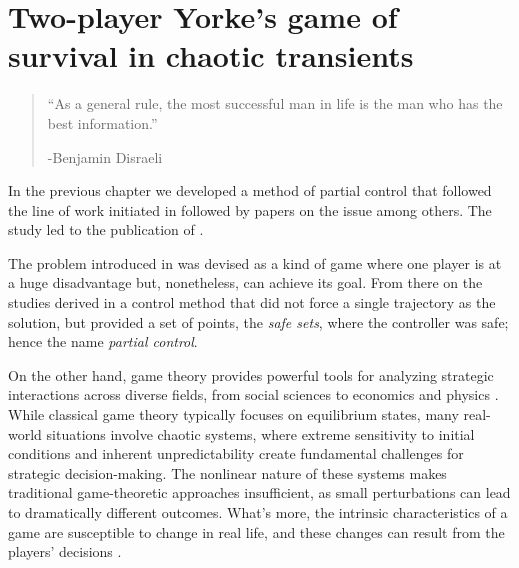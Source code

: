 \chapter{Two-player Yorke's game of survival in chaotic transients} %
\label{chap:PartialControlGame}


\begin{quotation}

	\vspace{-3cm}
	\begin{flushright}
    \begin{minipage}[t][5cm][b]{0.5\textwidth}
    { ``As a general rule, the most successful man in life is the man who has the best information.''}
    
    \bigskip
    
    -{\small  Benjamin Disraeli}
    \end{minipage}
    \end{flushright}



    \vspace{0.5cm}

\end{quotation}




In the previous chapter we developed a method of partial control that followed the line of work initiated in \cite{Yorke} followed by papers on the issue \cite{DynamicsPartialControl,PartialControlBeyond,PartialControlFunctions} among others. The study led to the publication of \cite{PartialControlEscape}. 

The problem introduced in \cite{Yorke} was devised as a kind of game where one player is at a huge disadvantage but, nonetheless, can achieve its goal. From there on the studies derived in a control method that did not force a single trajectory as the solution, but provided a set of points, the \textit{safe sets}, where the controller was safe; hence the name \textit{partial control}.

On the other hand, game theory provides powerful tools for analyzing strategic interactions across diverse fields, from social sciences to economics and physics \cite{Social,EconomyGames,GamesComplex}. While classical game theory typically focuses on equilibrium states, many real-world situations involve chaotic systems, where extreme sensitivity to initial conditions and inherent unpredictability create fundamental challenges for strategic decision-making. The nonlinear nature of these systems makes traditional game-theoretic approaches insufficient, as small perturbations can lead to dramatically different outcomes. What's more, the intrinsic characteristics of a game are susceptible to change in real life, and these changes can result from the players' decisions \cite{AkiyamaKaneko1,AkiyamaKaneko2}.

